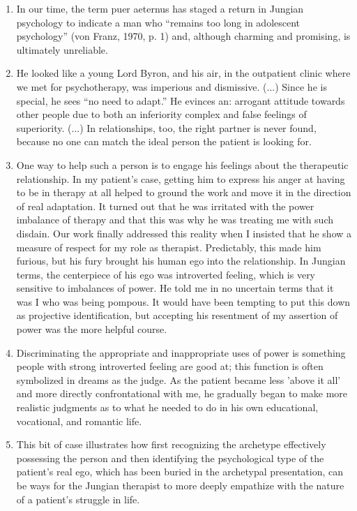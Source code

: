 \begin{enumerate}

\item {} In our time, the term puer aeternus has staged a
return in Jungian psychology to indicate a man who ``remains too long in
adolescent psychology'' (von Franz, 1970, p. 1) and, although charming and
promising, is ultimately unreliable.

\item {} He looked like a young Lord Byron, and his air,
in the outpatient clinic where we met for psychotherapy, was imperious and
dismissive. (...) Since he is special, he sees ``no need to adapt.'' He evinces
an: arrogant attitude towards other people due to both an inferiority complex
and false feelings of superiority. (...) In relationships, too, the right
partner is never found, because no one can match the ideal person the patient
is looking for.

\item {} One way to help such a person is to
engage his feelings about the therapeutic relationship. In my patient's case,
getting him to express his anger at having to be in therapy at all helped to
ground the work and move it in the direction of real adaptation. It turned out
that he was irritated with the power imbalance of therapy and that this was why
he was treating me with such disdain. Our work finally addressed this reality
when I insisted that he show a measure of respect for my role as therapist.
Predictably, this made him furious, but his fury brought his human ego into the
relationship. In Jungian terms, the centerpiece of his ego was introverted
feeling, which is very sensitive to imbalances of power. He told me in no
uncertain terms that it was I who was being pompous. It would have been
tempting to put this down as projective identification, but accepting his
resentment of my assertion of power was the more helpful course.

\item {} Discriminating the appropriate and
inappropriate uses of power is something people with strong introverted feeling
are good at; this function is often symbolized in dreams as the judge. As the
patient became less 'above it all' and more directly confrontational with me,
he gradually began to make more realistic judgments as to what he needed to do
in his own educational, vocational, and romantic life.

\item {} This bit of case illustrates how first
recognizing the archetype effectively possessing the person and then
identifying the psychological type of the patient's real ego, which has been
buried in the archetypal presentation, can be ways for the Jungian therapist to
more deeply empathize with the nature of a patient's struggle in life.

\end{enumerate}

